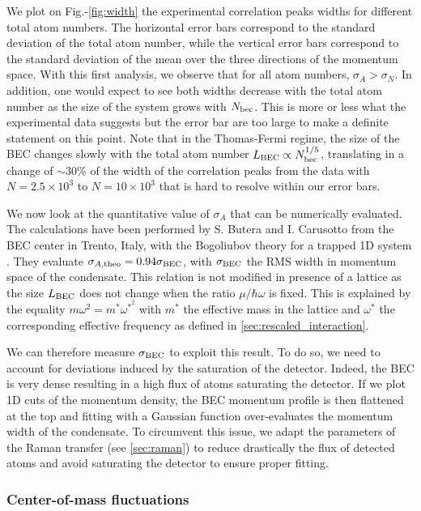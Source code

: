 We plot on Fig.-\ref{fig:width} the experimental correlation peaks widths for different total atom numbers. The horizontal error bars correspond to the standard deviation of the total atom number, while the vertical error bars correspond to the standard deviation of the mean over the three directions of the momentum space. With this first analysis, we observe that for all atom numbers, $\sigma_A > \sigma_N$. In addition, one would expect to see both widths decrease with the total atom number as the size of the system grows with $N_{\rm{bec}}$. This is more or less what the experimental data suggests but the error bar are too large to make a definite statement on this point. Note that in the Thomas-Fermi regime, the size of the BEC changes slowly with the total atom number $L_{\rm{BEC}} \propto N_{\rm{bec}}^{1/5}$, translating in a change of $\sim 30\%$ of the width of the correlation peaks from the data with $N=2.5 \times 10^3$ to $N=10 \times 10^3$ that is hard to resolve within our error bars.

We now look at the quantitative value of $\sigma_A$ that can be numerically evaluated. The calculations have been performed by S. Butera and I. Carusotto from the BEC center in Trento, Italy, with the Bogoliubov theory for a trapped 1D system \cite{butera2020}. They evaluate $\sigma_{A,\rm{theo}} = 0.94 \sigma_{\rm{BEC}}$, with $\sigma_{\rm{BEC}}$ the RMS width in momentum space of the condensate. This relation is not modified in presence of a lattice as the size $L_{\rm{BEC}}$ does not change when the ratio $\mu/\hbar \omega$ is fixed. This is explained by the equality $m \omega^2 = m^* \omega^* ^2$ with $m^*$ the effective mass in the lattice and $\omega^*$ the corresponding effective frequency as defined in \ref{sec:rescaled_interaction}.

We can therefore measure $\sigma_{\rm{BEC}}$ to exploit this result. To do so, we need to account for deviations induced by the saturation of the detector. Indeed, the BEC is very dense resulting in a high flux of atoms saturating the detector. If we plot 1D cuts of the momentum density, the BEC momentum profile is then flattened at the top and fitting with a Gaussian function over-evaluates the momentum width of the condensate. To circumvent this issue, we adapt the parameters of the Raman transfer (see \ref{sec:raman}) to reduce drastically the flux of detected atoms and avoid saturating the detector to ensure proper fitting.

\subsubsection{Center-of-mass fluctuations}

